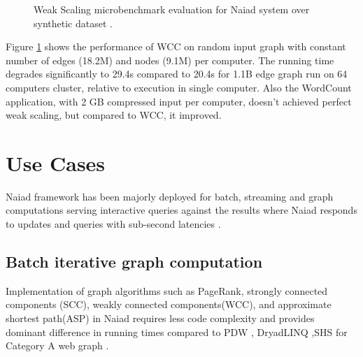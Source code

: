 \documentclass[9pt,twocolumn,twoside]{../../styles/osajnl}
\begin{document}
\begin{figure}[htbp]
\centering
{}
\caption{ Weak Scaling microbenchmark evaluation for Naiad system over
  synthetic dataset \cite{paper1-Naiad}.}
\label{weak scaling}
\end{figure}

Figure \ref{weak scaling} shows the performance of WCC on random input
graph with constant number of edges (18.2M) and nodes (9.1M) per
computer. The running time degrades significantly to 29.4s compared to
20.4s for 1.1B edge graph run on 64 computers cluster, relative to
execution in single computer. Also the WordCount application, with 2
GB compressed input per computer, doesn't achieved perfect weak
scaling, but compared to WCC, it improved.


\section{Use Cases}
Naiad framework has been majorly deployed for batch, streaming and
graph computations serving interactive queries against the results
where Naiad responds to updates and queries with sub-second latencies
\cite{paper1-Naiad}.

\subsection{Batch iterative graph computation}
Implementation of graph algorithms such as PageRank, strongly
connected components (SCC), weakly connected components(WCC), and
approximate shortest path(ASP) in Naiad requires less code complexity
and provides dominant difference in running times compared to PDW
\cite{www-PDW}, DryadLINQ \cite{paper-DryadLINQ},SHS \cite{paper-SHS}
for Category A web graph
\cite{dataset-clueweb09,paper1-Naiad,paper-Largegraphs}.
\end{document}
